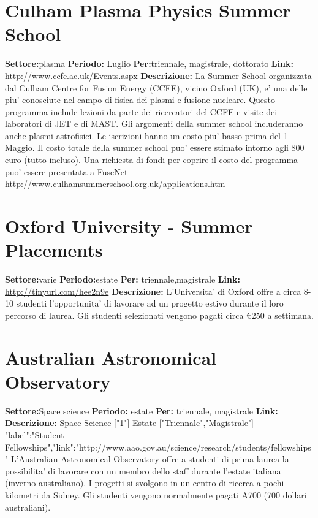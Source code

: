 \documentclass[a4paper,10pt]{article}
\begin{document}
\section{	Culham Plasma Physics Summer School}
\textbf{Settore:}plasma \newline
\textbf{Periodo:} Luglio\newline
\textbf{Per:}triennale, magistrale, dottorato\newline
\textbf{Link:} \url{http://www.ccfe.ac.uk/Events.aspx} \newline
\textbf{Descrizione:}  	La Summer School organizzata dal Culham Centre for Fusion Energy (CCFE), vicino Oxford (UK), e' una delle piu' conosciute nel campo di fisica dei plasmi e fusione nucleare. Questo programma include lezioni da parte dei ricercatori del CCFE e visite dei laboratori di JET e di MAST. Gli argomenti della summer school includeranno anche plasmi astrofisici. Le iscrizioni hanno un costo piu' basso prima del 1 Maggio. Il costo totale della summer school puo' essere stimato intorno agli 800 euro (tutto incluso). Una richiesta di fondi per coprire il costo del programma puo' essere presentata a FuseNet \url{http://www.culhamsummerschool.org.uk/applications.htm} 	

\section{	Oxford University - Summer Placements	}
\textbf{Settore:}varie \newline
\textbf{Periodo:}estate \newline
\textbf{Per:} triennale,magistrale\newline
\textbf{Link:} \url{http://tinyurl.com/hee2n9e} \newline
\textbf{Descrizione:}  	L'Universita' di Oxford offre a circa 8-10 studenti l'opportunita' di lavorare ad un progetto estivo durante il loro percorso di laurea. Gli studenti selezionati vengono pagati circa €250 a settimana.	

\section{	Australian Astronomical Observatory}
\textbf{Settore:}Space science \newline
\textbf{Periodo:} estate\newline
\textbf{Per:} triennale, magistrale\newline
\textbf{Link:} \url{} \newline
\textbf{Descrizione:}  	Space Science	["1"]	Estate	["Triennale","Magistrale"]	{"label":"Student Fellowships","link":"http://www.aao.gov.au/science/research/students/fellowships"}	L'Australian Astronomical Observatory offre a studenti di prima laurea la possibilita' di lavorare con un membro dello staff durante l'estate italiana (inverno australiano). I progetti si svolgono in un centro di ricerca a pochi kilometri da Sidney. Gli studenti vengono normalmente pagati A700 (700 dollari australiani). 	
\end{document}
